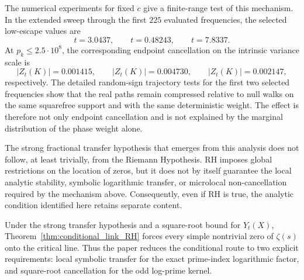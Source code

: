 \documentclass[11pt]{amsart}
\numberwithin{equation}{section}
\theoremstyle{plain}
\theoremstyle{definition}
\theoremstyle{remark}
\begin{document}
The numerical experiments for fixed $c$ give a finite-range test of this
mechanism.  In the extended sweep through the first $225$ evaluated
frequencies, the selected low-escape values are
\begin{equation}
t=3.0437,
\qquad
 t=0.48243,
\qquad
 t=7.8337.
\label{eq:conclusion_selected_frequencies}
\end{equation}
At $p_k\le 2.5\cdot10^8$, the corresponding endpoint cancellation on the
intrinsic variance scale is
\begin{equation}
|Z_t(K)|=0.001415,
\qquad
|Z_t(K)|=0.004730,
\qquad
|Z_t(K)|=0.002147,
\label{eq:conclusion_selected_Z_values}
\end{equation}
respectively.  The detailed random-sign trajectory tests for the first two
selected frequencies show that the real paths remain compressed relative to
null walks on the same squarefree support and with the same deterministic
weight.  The effect is therefore not only endpoint cancellation and is not
explained by the marginal distribution of the phase weight alone.

The strong fractional transfer hypothesis that emerges from this analysis
does not follow, at least trivially, from the Riemann Hypothesis.  RH imposes
global restrictions on the location of zeros, but it does not by itself
guarantee the local analytic stability, symbolic logarithmic transfer, or
microlocal non-cancellation required by the mechanism above.  Consequently,
even if RH is true, the analytic condition identified here retains separate
content.

Under the strong transfer hypothesis and a square-root bound for
$Y_t(X)$, Theorem~\ref{thm:conditional_link_RH} forces every simple
nontrivial zero of $\zeta(s)$ onto the critical line.  Thus the paper reduces
the conditional route to two explicit requirements: local symbolic transfer
for the exact prime-index logarithmic factor, and square-root cancellation
for the odd log-prime kernel.
\end{document}
